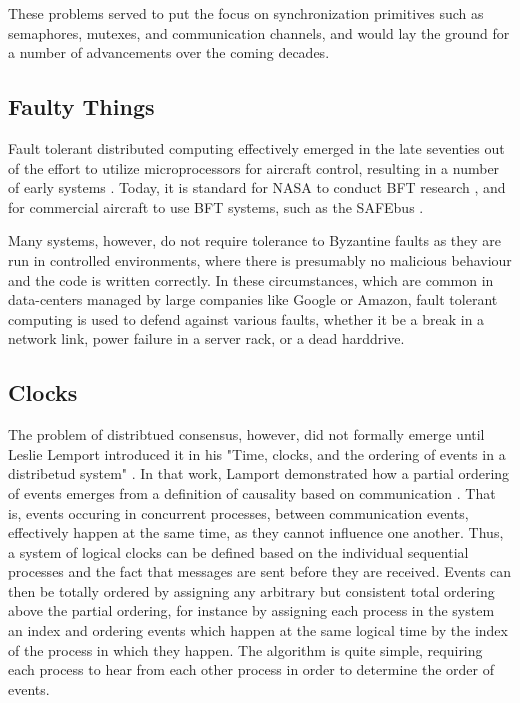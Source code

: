 These problems served to put the focus on synchronization primitives
such as semaphores, mutexes, and communication channels,
and would lay the ground for a number of advancements over the coming decades.

\subsection{Faulty Things}

Fault tolerant distributed computing effectively emerged in the late seventies 
out of the effort to utilize microprocessors for aircraft control, resulting in a number of early systems \cite{sift,ftmp}.
Today, it is standard for NASA to conduct BFT research \cite{miner2004unified}, 
and for commercial aircraft to use BFT systems, such as the SAFEbus \cite{hoyme1993safebus}.

Many systems, however, do not require tolerance to Byzantine faults as they are run in controlled environments,
where there is presumably no malicious behaviour and the code is written correctly.
In these circumstances, which are common in data-centers managed by large companies like Google or Amazon,
fault tolerant computing is used to defend against various faults,
whether it be a break in a network link, power failure in a server rack, or a dead harddrive.

\subsection{Clocks}

The problem of distribtued consensus, however, did not formally emerge until Leslie Lemport introduced it in his 
"Time, clocks, and the ordering of events in a distribetud system" \cite{clocks}.
In that work, Lamport demonstrated how a partial ordering of events emerges from a definition of causality based on communication \cite{clocks}.
That is, events occuring in concurrent processes, between communication events, 
effectively happen at the same time, as they cannot influence one another.
Thus, a system of logical clocks can be defined based on the individual sequential processes 
and the fact that messages are sent before they are received.
Events can then be totally ordered by assigning any arbitrary but consistent total ordering above the partial ordering,
for instance by assigning each process in the system an index and ordering events which happen at the same logical time by the
index of the process in which they happen.
The algorithm is quite simple, requiring each process to hear from each other process in order to determine the order of events.

